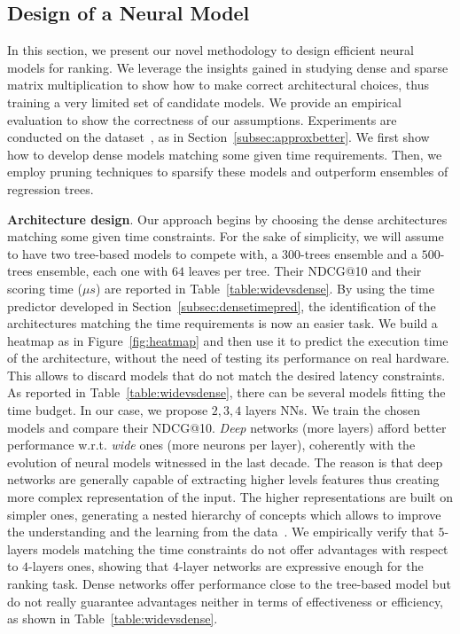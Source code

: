 \subsection{Design of a Neural Model}
\label{subsec::neuraldesign}
In this section, we present our novel methodology to design efficient neural models for ranking. We leverage the insights gained in studying dense and sparse matrix multiplication to show how to make correct architectural choices, thus training a very limited set of candidate models. We provide an empirical evaluation to show the correctness of our assumptions. 
Experiments are conducted on the  \msn dataset~\cite{DBLP:journals/corr/QinL13}, as in Section~\ref{subsec:approxbetter}. We first show how to develop dense models matching some given time requirements. Then, we employ pruning techniques to sparsify these models and outperform ensembles of regression trees.

\smallskip
\noindent \textbf{Architecture design}.
Our approach begins by choosing the dense architectures matching some given time constraints. For the sake of simplicity, we will assume to have two tree-based models to compete with, a $300$-trees ensemble and a $500$-trees ensemble, each one with $64$ leaves per tree. Their NDCG@10  and their scoring time ($\mu s$) are reported in Table~\ref{table:widevsdense}. By using the time predictor developed in Section~\ref{subsec:densetimepred}, the identification of the architectures matching the time requirements is now an easier task.
We build a heatmap as in Figure~\ref{fig:heatmap} and then use it to predict the execution time of the architecture, without the need of testing its performance on real hardware. This allows to discard models that do not match the desired latency constraints. As reported in Table~\ref{table:widevsdense}, there can be several models fitting the time budget. In our case, we propose $2,3,4$ layers NNs. We train the chosen models and compare their NDCG@10. \textit{Deep} networks (more layers) afford better performance w.r.t. \textit{wide} ones (more neurons per layer), coherently with the evolution of neural models witnessed in the last decade. The reason is that deep networks are generally capable of extracting higher levels features thus creating more complex representation of the input. The higher representations are built on simpler ones, generating a nested hierarchy of concepts which allows to improve the understanding and the learning from the data~\cite{Goodfellow-et-al-2016}. We empirically verify that $5$-layers models matching the time constraints do not offer advantages with respect to $4$-layers ones, showing that $4$-layer networks are expressive enough for the ranking task. Dense networks offer performance close to the tree-based model but do not really guarantee advantages neither in terms of effectiveness or efficiency, as shown in Table~\ref{table:widevsdense}.

